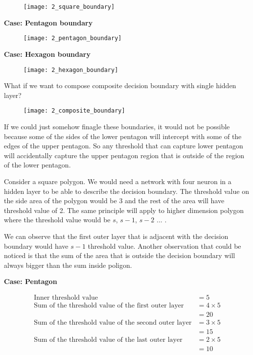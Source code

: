 \begin{figure}[H]
	\centering
	\texttt{[image: 2\_square\_boundary]}
\end{figure}

\hfill\break
\textbf{Case: Pentagon boundary}

\begin{figure}[h]
	\centering
	\texttt{[image: 2\_pentagon\_boundary]}
\end{figure}

\hfill\break
\textbf{Case: Hexagon boundary}

\begin{figure}[H]
	\centering
	\texttt{[image: 2\_hexagon\_boundary]}
\end{figure}

\hfill\break
What if we want to compose composite decision boundary with single hidden layer?

\begin{figure}[H]
	\centering
	\texttt{[image: 2\_composite\_boundary]}
\end{figure}

\hfill\linebreak
If we could just somehow finagle these boundaries, it would not be possible because some of the sides of the lower pentagon will intercept with some of the edges of the upper pentagon. So any threshold that can capture lower pentagon will accidentally capture the upper pentagon region that is outside of the region of the lower pentagon.

Consider a square polygon. We would need a network with four neuron in a hidden layer to be able to describe the decision boundary. The threshold value on the side area of the polygon would be 3 and the rest of the area will have threshold value of 2. The same principle will apply to higher dimension polygon where the threshold value would be $s$, $s-1$, $s-2$ $...$ .

We can observe that the first outer layer that is adjacent with the decision boundary would have $s-1$ threshold value. Another observation that could be noticed is that the sum of the area that is outside the decision boundary will always bigger than the sum inside poligon.

\hfill\linebreak
\textbf{Case: Pentagon}

\begin{align*}
	\text{Inner threshold value} &= 5 \\
	\text{Sum of the threshold value of the first outer layer} &= 4 \times 5 \\
	&= 20 \\
	\text{Sum of the threshold value of the second outer layer} &= 3 \times 5 \\
	&= 15 \\
	\text{Sum of the threshold value of the last outer layer} &= 2 \times 5 \\
	&= 10 \\
\end{align*}

